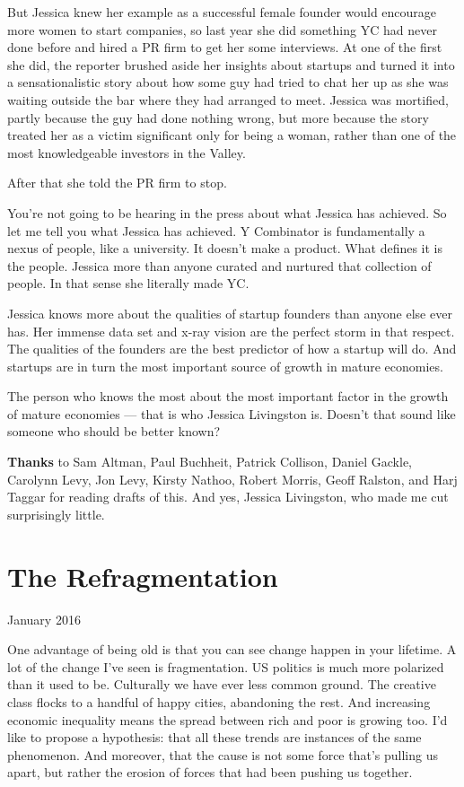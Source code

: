 \documentclass[12pt]{book}
\begin{document}
But Jessica knew her example as a successful female founder would
encourage more women to start companies, so last year she did something
YC had never done before and hired a PR firm to get her some interviews.
At one of the first she did, the reporter brushed aside her insights
about startups and turned it into a sensationalistic story about how
some guy had tried to chat her up as she was waiting outside the bar
where they had arranged to meet. Jessica was mortified, partly because
the guy had done nothing wrong, but more because the story treated her
as a victim significant only for being a woman, rather than one of the
most knowledgeable investors in the Valley.

After that she told the PR firm to stop.

You're not going to be hearing in the press about what Jessica has
achieved. So let me tell you what Jessica has achieved. Y Combinator is
fundamentally a nexus of people, like a university. It doesn't make a
product. What defines it is the people. Jessica more than anyone curated
and nurtured that collection of people. In that sense she literally made
YC.

Jessica knows more about the qualities of startup founders than anyone
else ever has. Her immense data set and x-ray vision are the perfect
storm in that respect. The qualities of the founders are the best
predictor of how a startup will do. And startups are in turn the most
important source of growth in mature economies.

The person who knows the most about the most important factor in the
growth of mature economies --- that is who Jessica Livingston is.
Doesn't that sound like someone who should be better known?


\textbf{Thanks} to Sam Altman, Paul Buchheit, Patrick Collison, Daniel
Gackle, Carolynn Levy, Jon Levy, Kirsty Nathoo, Robert Morris, Geoff
Ralston, and Harj Taggar for reading drafts of this. And yes, Jessica
Livingston, who made me cut surprisingly little.
\chapter{The Refragmentation}

January 2016

One advantage of being old is that you can see change happen in your
lifetime. A lot of the change I've seen is fragmentation. US politics is
much more polarized than it used to be. Culturally we have ever less
common ground. The creative class flocks to a handful of happy cities,
abandoning the rest. And increasing economic inequality means the spread
between rich and poor is growing too. I'd like to propose a hypothesis:
that all these trends are instances of the same phenomenon. And
moreover, that the cause is not some force that's pulling us apart, but
rather the erosion of forces that had been pushing us together.
\end{document}
